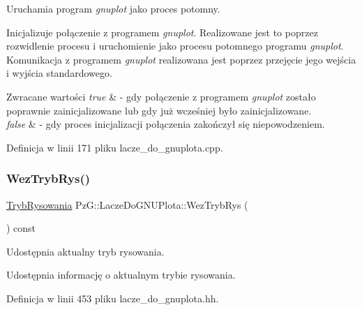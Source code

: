 Uruchamia program {\itshape gnuplot} jako proces potomny. 

Inicjalizuje połączenie z programem {\itshape gnuplot}. Realizowane jest to poprzez rozwidlenie procesu i uruchomienie jako procesu potomnego programu {\itshape gnuplot}. Komunikacja z programem {\itshape gnuplot} realizowana jest poprzez przejęcie jego wejścia i wyjścia standardowego.


\begin{DoxyRetVals}{Zwracane wartości}
{\em true} & -\/ gdy połączenie z programem {\itshape gnuplot} zostało poprawnie zainicjalizowane lub gdy już wcześniej było zainicjalizowane. \\
\hline
{\em false} & -\/ gdy proces inicjalizacji połączenia zakończył się niepowodzeniem. \\
\hline
\end{DoxyRetVals}


Definicja w linii 171 pliku lacze\+\_\+do\+\_\+gnuplota.\+cpp.

\mbox{\label{class_pz_g_1_1_lacze_do_g_n_u_plota_a7c417f27b4b112f58a5be3ce6ea8d1fe}} 
\subsubsection{\texorpdfstring{Wez\+Tryb\+Rys()}{WezTrybRys()}}
{\footnotesize\ttfamily \hyperlink{namespace_pz_g_aeedae1ef10c66d720f9e89de408ca4ca}{Tryb\+Rysowania} Pz\+G\+::\+Lacze\+Do\+G\+N\+U\+Plota\+::\+Wez\+Tryb\+Rys (\begin{DoxyParamCaption}{ }\end{DoxyParamCaption}) const\hspace{0.3cm}{\ttfamily [inline]}}



Udostępnia aktualny tryb rysowania. 

Udostępnia informację o aktualnym trybie rysowania. 

Definicja w linii 453 pliku lacze\+\_\+do\+\_\+gnuplota.\+hh.

\mbox{\label{class_pz_g_1_1_lacze_do_g_n_u_plota_a4531e6d166faf2e2c8bb4a54a9c9e1f8}} 
